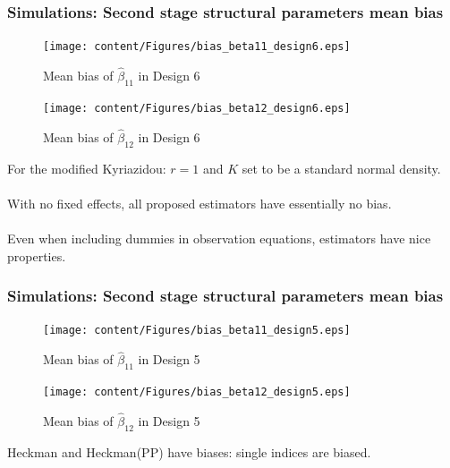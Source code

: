 \begin{frame}
    \frametitle{Simulations: Second stage structural parameters mean bias}
    \begin{minipage}{7cm}
    \begin{figure}[htbp]
      \centerline{\texttt{[image: content/Figures/bias\_beta11\_design6.eps]}}
      \caption{\footnotesize{Mean bias of  $\hat{\beta}_{11}$ in Design 6}}
      \label{bias_beta11_design6}
    \end{figure}
    \begin{figure}[htbp]
      \vspace{-2.5em}%
      \centerline{\texttt{[image: content/Figures/bias\_beta12\_design6.eps]}}
      \caption{\footnotesize{Mean bias of  $\hat{\beta}_{12}$ in Design 6}}
      \label{bias_beta12_design6}
    \end{figure}
  \end{minipage}%
  \begin{minipage}{5cm}
             For the modified Kyriazidou: $r=1$ and $K$ set to be a standard normal density.\\~\\
             With no fixed effects, all proposed estimators have essentially no bias. \\~\\
             Even when including dummies in observation equations, estimators have nice properties. 
            \end{minipage}
  \end{frame}

  \begin{frame}
    \frametitle{Simulations: Second stage structural parameters mean bias}
    \begin{minipage}{7cm}
    \begin{figure}[htbp]
      \centerline{\texttt{[image: content/Figures/bias\_beta11\_design5.eps]}}
      \caption{\footnotesize{Mean bias of  $\hat{\beta}_{11}$ in Design 5}}
      \label{bias_beta11_design5}
    \end{figure}
    \begin{figure}[htbp]
      \vspace{-2.5em}%
      \centerline{\texttt{[image: content/Figures/bias\_beta12\_design5.eps]}}
      \caption{\footnotesize{Mean bias of  $\hat{\beta}_{12}$ in Design 5}}
      \label{bias_beta12_design5}
    \end{figure}
  \end{minipage}%
  \begin{minipage}{5cm}
    Heckman and Heckman(PP) have biases: single indices are biased.\\~\\
  \end{minipage}
  \end{frame}

